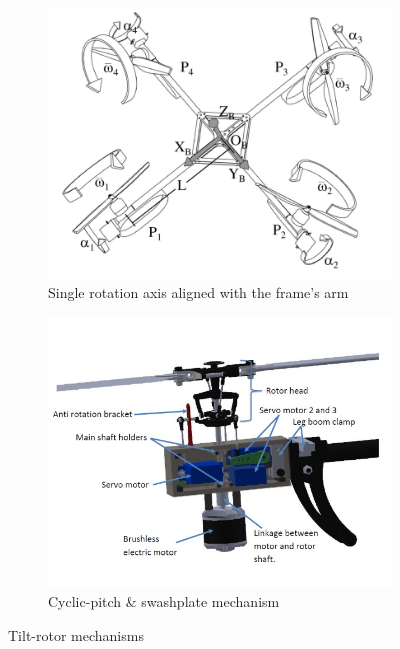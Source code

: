 \begin{figure}[htbp]
\centering
\begin{subfigure}{.5\textwidth}
\includegraphics[width=\textwidth]{figs/tiltpropellercontrol1}
\caption{Single rotation axis aligned with the frame's arm}
\label{fig:tiltpropellercontrol1}
\end{subfigure}%
\begin{subfigure}{.5\textwidth}
\includegraphics[width=\textwidth]{figs/napsholm-mech}
\caption{Cyclic-pitch \& swashplate mechanism}
\label{fig:tiltrotor-napsholm}
\end{subfigure}
\caption{Tilt-rotor mechanisms}
\label{fig:tiltprop}
\end{figure}
